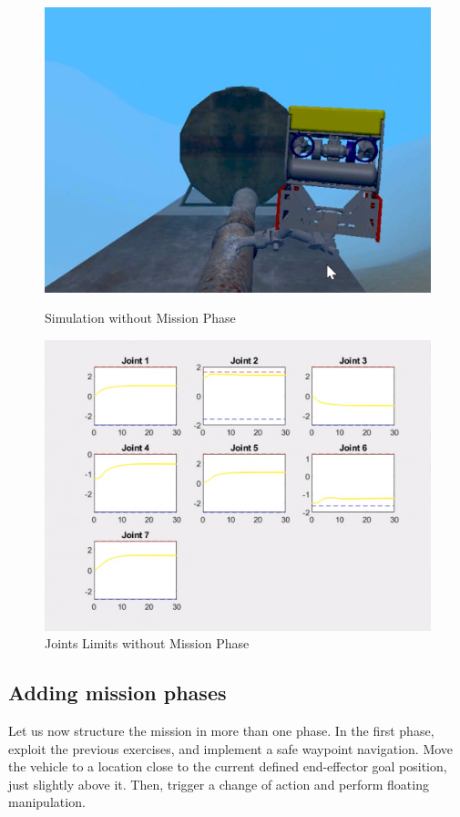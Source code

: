 \documentclass{article}
\begin{document}
\begin{figure}[htpb]
\begin{minipage}{0.40\textwidth}
\includegraphics[width=\textwidth]{513_comment.png}
\caption{Simulation without Mission Phase}\label{513_nh2} 
\end{minipage}
\hspace{0.2\textwidth} 
\begin{minipage}{0.40\textwidth}  
\includegraphics[width=\textwidth]{513_woutPS_jointLimits.png}
\caption{Joints Limits without Mission Phase}\label{513_h2} 
\end{minipage}
\end{figure}


\clearpage

\subsection{Adding mission phases}
Let us now structure the mission in more than one phase. In the first phase, exploit the previous exercises, and implement a safe waypoint navigation. Move the vehicle to a location close to the current defined end-effector goal position, just slightly above it. Then, trigger a change of action and perform floating manipulation.
\end{document}

